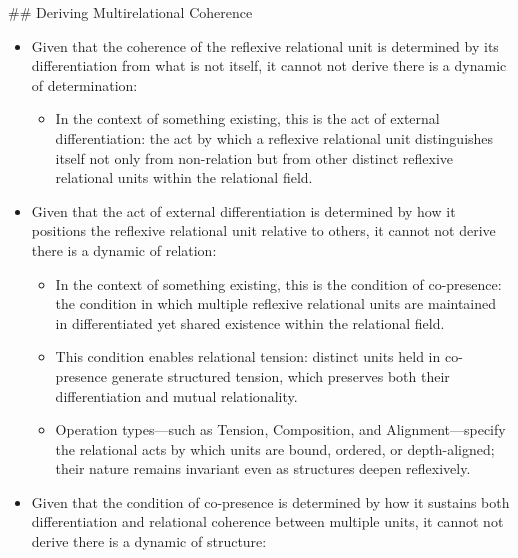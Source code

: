 \documentclass[11pt]{article}
\begin{document}
\#\# Deriving Multirelational Coherence
\begin{itemize}
\item Given that the coherence of the reflexive relational unit is determined by its differentiation from what is not itself, it cannot not derive there is a dynamic of determination:

\begin{itemize}
\item In the context of something existing, this is the act of external differentiation: the act by which a reflexive relational unit distinguishes itself not only from non-relation but from other distinct reflexive relational units within the relational field.
\end{itemize}

\item Given that the act of external differentiation is determined by how it positions the reflexive relational unit relative to others, it cannot not derive there is a dynamic of relation:

\begin{itemize}
\item In the context of something existing, this is the condition of co-presence: the condition in which multiple reflexive relational units are maintained in differentiated yet shared existence within the relational field.
\item This condition enables relational tension: distinct units held in co-presence generate structured tension, which preserves both their differentiation and mutual relationality.
\item Operation types—such as Tension, Composition, and Alignment—specify the relational acts by which units are bound, ordered, or depth-aligned; their nature remains invariant even as structures deepen reflexively.
\end{itemize}
\item Given that the condition of co-presence is determined by how it sustains both differentiation and relational coherence between multiple units, it cannot not derive there is a dynamic of structure:


\end{itemize}
\end{document}
